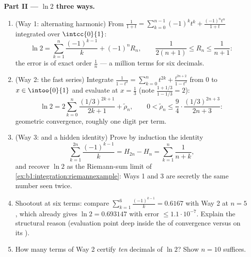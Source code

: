 \begin{problem}
\medskip
\noindent\textbf{Part II --- $\ln 2$ three ways.}
\begin{enumerate}[resume]
  \item (Way 1: alternating harmonic) From $\frac{1}{1+t} =
        \sum_{k=0}^{n-1}(-1)^k t^k + \frac{(-1)^n t^n}{1+t}$
        integrated over $\intcc{0}{1}$:
        \[
        \ln 2 = \sum_{k=1}^{n} \frac{(-1)^{k-1}}{k} + (-1)^n
        R_n, \qquad \frac{1}{2(n+1)} \leq R_n \leq
        \frac{1}{n+1} :
        \]
        the error is of exact order $\frac 1n$ --- a million
        terms for six decimals.
  \item (Way 2: the fast series) Integrate $\frac{1}{1 - t^2} =
        \sum_{k=0}^{n} t^{2k} + \frac{t^{2n+2}}{1-t^2}$ from $0$
        to $x \in \intoo{0}{1}$ and evaluate at $x = \frac13$
        (note $\frac{1 + 1/3}{1 - 1/3} = 2$):
        \[
        \ln 2 = 2\sum_{k=0}^{n} \frac{(1/3)^{2k+1}}{2k+1} +
        \tilde\rho_n,
        \qquad
        0 < \tilde\rho_n \leq \frac{9}{4}\cdot
        \frac{(1/3)^{2n+3}}{2n+3} :
        \]
        geometric convergence, roughly one digit per term.
  \item (Way 3:  and a hidden identity) Prove by
        induction the identity
        \[
        \sum_{k=1}^{2n} \frac{(-1)^{k-1}}{k} = H_{2n} - H_n =
        \sum_{k=1}^{n} \frac{1}{n + k} ,
        \]
        and recover $\ln 2$ as the Riemann-sum limit of
        \cref{ex:b1:integration:riemannexample}: Ways 1 and 3
        are secretly the same number seen twice.
  \item Shootout at six terms: compare $\sum_{k=1}^{6}
        \frac{(-1)^{k-1}}{k} = 0.6167$ with Way 2 at $n = 5$,
        which already gives $\ln 2 = 0.693147$ with error $\leq
        1.1\cdot10^{-7}$. Explain the structural reason
        (evaluation point deep inside the  of
        convergence versus on its ).
  \item How many terms of Way 2 certify \emph{ten} decimals of
        $\ln 2$? Show $n = 10$ suffices.
\end{enumerate}


\end{problem}

